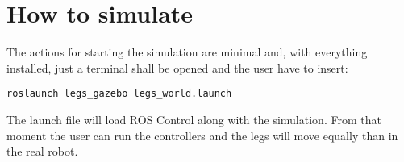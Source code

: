 \section{How to simulate} %
\label{sec:how_to_simulate}
The actions for starting the simulation are minimal and, with everything installed, just a terminal shall be opened and the user have to insert:

\begin{lstlisting}
roslaunch legs_gazebo legs_world.launch
\end{lstlisting}

The launch file will load ROS Control along with the simulation.
From that moment the user can run the controllers and the legs will move equally than in the real robot.
